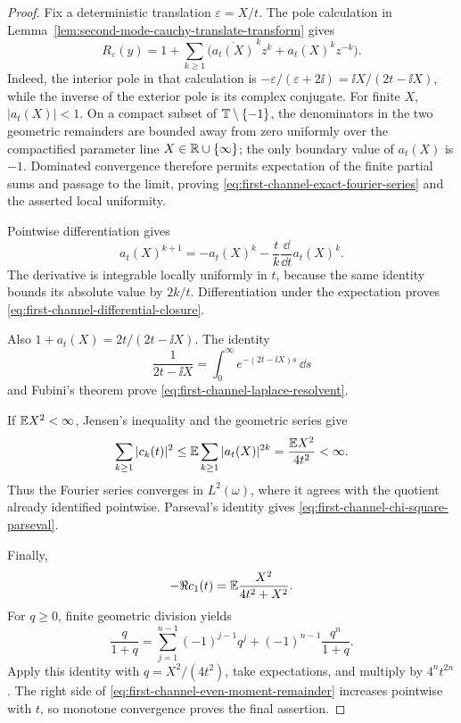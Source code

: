 \begin{proof}
Fix a deterministic translation \(\varepsilon=X/t\).
The pole calculation in
Lemma~\ref{lem:second-mode-cauchy-translate-transform} gives
\[
 R_\varepsilon(y)
 =1+\sum_{k\ge1}\bigl(\overline{a_t(X)}^{\,k}z^k
 +a_t(X)^kz^{-k}\bigr).
\]
Indeed, the interior pole in that calculation is
\(-\varepsilon/(\varepsilon+2\ii)=\ii X/(2t-\ii X)\), while the inverse of
the exterior pole is its complex conjugate.  For finite \(X\),
\(|a_t(X)|<1\).  On a compact subset of
\(\mathbb{T}\setminus\{-1\}\), the denominators in the two geometric remainders
are bounded away from zero uniformly over the compactified parameter line
\(X\in\mathbb{R}\cup\{\infty\}\); the only boundary value of \(a_t(X)\) is
\(-1\).  Dominated convergence therefore permits expectation of the finite
partial sums and passage to the limit, proving
\eqref{eq:first-channel-exact-fourier-series} and the asserted local
uniformity.

Pointwise differentiation gives
\[
 a_t(X)^{k+1}=-a_t(X)^k-\frac{t}{k}
 \frac{\dd}{\dd t}a_t(X)^k.
\]
The derivative is integrable locally uniformly in \(t\), because the same
identity bounds its absolute value by \(2k/t\).  Differentiation under the
expectation proves \eqref{eq:first-channel-differential-closure}.

Also \(1+a_t(X)=2t/(2t-\ii X)\).  The identity
\[
 \frac1{2t-\ii X}=\int_0^\infty e^{-(2t-\ii X)s}\,\dd s
\]
and Fubini's theorem prove \eqref{eq:first-channel-laplace-resolvent}.

If \(\mathbb{E} X^2<\infty\), Jensen's inequality and the geometric series give
\[
 \sum_{k\ge1}|c_k(t)|^2
 \le\mathbb{E}\sum_{k\ge1}|a_t(X)|^{2k}
 =\frac{\mathbb{E} X^2}{4t^2}<\infty.
\]
Thus the Fourier series converges in \(L^2(\omega)\), where it agrees with
the quotient already identified pointwise.  Parseval's identity gives
\eqref{eq:first-channel-chi-square-parseval}.

Finally,
\begin{equation}\label{eq:first-channel-real-part}
 -\Re c_1(t)=\mathbb{E}\frac{X^2}{4t^2+X^2}.
\end{equation}
For \(q\ge0\), finite geometric division yields
\[
 \frac q{1+q}=\sum_{j=1}^{n-1}(-1)^{j-1}q^j
 +(-1)^{n-1}\frac{q^n}{1+q}.
\]
Apply this identity with \(q=X^2/(4t^2)\), take expectations, and multiply
by \(4^nt^{2n}\).  The right side of
\eqref{eq:first-channel-even-moment-remainder} increases pointwise with
\(t\), so monotone convergence proves the final assertion.
\end{proof}

